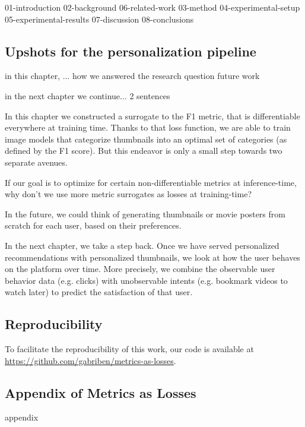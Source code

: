 {01-introduction}
{02-background}
{06-related-work}
{03-method}
{04-experimental-setup}
{05-experimental-results}
{07-discussion}
{08-conclusions}

\section{Upshots for the personalization pipeline}

in this chapter, ...
how we answered the research question
future work

in the next chapter we continue...
2 sentences
\fi

In this chapter we constructed a surrogate to the F1 metric, that is differentiable everywhere at training time.  Thanks to that loss function, we are able to train image models that categorize thumbnails into an optimal set of categories (as defined by the F1 score). But this endeavor is only a small step towards two separate avenues.
\begin{enumerate*}[label={(\roman*)}]
\item If our goal is to optimize for certain non-differentiable metrics at inference-time, why don't we use more metric surrogates as losses at training-time?
\item In the future, we could think of generating thumbnails or movie posters from scratch for each user, based on their preferences.
\end{enumerate*}

In the next chapter, we take a step back. Once we have served personalized recommendations with personalized thumbnails, we look at how the user behaves on the platform over time. More precisely, we combine the observable user behavior data (e.g. clicks) with unobservable intents (e.g. bookmark videos to watch later) to predict the satisfaction of that user.


\section*{Reproducibility}
To facilitate the reproducibility of this work, our code is available at \url{https://github.com/gabriben/metrics-as-losses}.


\begin{appendices}
\chapter{Appendix of Metrics as Losses}
{appendix}
\end{appendices}




